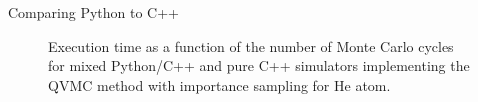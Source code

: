 \begin{frame}{Comparing Python to C++}
  \begin{figure}
      \scalebox{0.55}{}
    \caption{\scriptsize{Execution time as a function of the number of Monte Carlo cycles for mixed Python/C++ and pure C++ simulators implementing the QVMC method with importance sampling for He atom.}}
  \end{figure}  
\end{frame}



